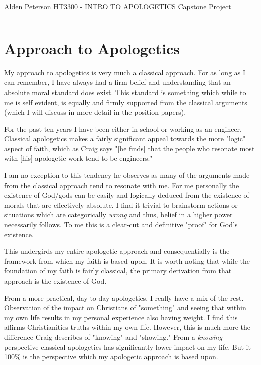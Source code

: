 \documentclass[12pt]{turabian-researchpaper}
\begin{document}
\begin{singlespace}
\noindent Alden Peterson \newline
\noindent HT3300 - INTRO TO APOLOGETICS \newline
\noindent Capstone Project \newline
\noindent\rule{4cm}{0.4pt}
\end{singlespace}

\setcounter{tocdepth}{4}

\tableofcontents
\newpage

\section{Approach to Apologetics}

My approach to apologetics is very much a classical approach. For as long as I can remember, I have always had a firm belief and understanding that an absolute moral standard does exist. This standard is something which while to me is self evident, is equally and firmly supported from the classical arguments (which I will discuss in more detail in the position papers). 

For the past ten years I have been either in school or working as an engineer. Classical apologetics makes a fairly significant appeal towards the more "logic" aspect of faith, which as Craig says "[he finds] that the people who resonate most with [his] apologetic work tend to be engineers."\autocite[pg.22]{craig2008reasonable} 

I am no exception to this tendency he observes as many of the arguments made from the classical approach tend to resonate with me. For me personally the existence of God/gods can be easily and logically deduced from the existence of morals that are effectively absolute. I find it trivial to brainstorm actions or situations which are categorically \textit{wrong} and thus, belief in a higher power necessarily follows. To me this is a clear-cut and definitive "proof" for God's existence.

This undergirds my entire apologetic approach and consequentially is the framework from which my faith is based upon. It is worth noting that while the foundation of my faith is fairly classical, the primary derivation from that approach is the existence of God. 

From a more practical, day to day apologetics, I really have a mix of the rest. Observation of the impact on Christians of "something" and seeing that within my own life results in my personal experience also having weight. I find this affirms Christianities truths within my own life. However, this is much more the difference Craig describes of "knowing" and "showing." From a \textit{knowing} perspective classical apologetics has significantly lower impact on my life. But it 100\% is the perspective which my apologetic approach is based upon.
 
\end{document}
